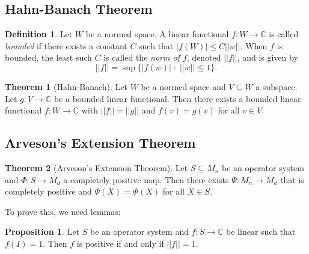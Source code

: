 \documentclass[12pt]{article}
\theoremstyle{definition}
\newtheorem*{theorem}{Theorem}
\newtheorem*{proposition}{Proposition}
\newtheorem*{definition}{Definition}
\newcommand{\C}{\mathbb{C}}
\begin{document}
\subsection{Hahn-Banach Theorem}

\begin{definition}
Let $W$ be a normed space. A linear functional $f:W \to \C$ is called \emph{bounded} if there exists a constant $C$ such that $|f(W)| \leq C||w||$. When $f$ is bounded, the least such $C$ is called the \emph{norm of $f$}, denoted $||f||$, and is given by
\[
||f|| = \sup\{|f(w)| \;:\; ||w|| \leq 1\}.
\]
\end{definition}

\begin{theorem}[Hahn-Banach]
Let $W$ be a normed space and $V \subseteq W$ a subspace. Let $g:V \to \C$ be a bounded linear functional. Then there exists a bounded linear functional $f:W \to \C$ with $||f||=||g||$ and $f(v)=g(v)$ for all $v \in V$.
\end{theorem}

\subsection{Arveson's Extension Theorem}

\begin{theorem}[Arveson's Extension Theorem]
Let $S \subseteq M_n$ be an operator system and $\Phi:S \to M_d$ a completely positive map. Then there exists $\Psi:M_n \to M_d$ that is completely positive and $\Psi(X)=\Phi(X)$ for all $X \in S$.
\end{theorem}

To prove this, we need lemmas:

\begin{proposition}
Let $S$ be an operator system and $f:S \to \C$ be linear such that $f(I)=1$. Then $f$ is positive if and only if $||f||=1$.
\end{proposition}
\end{document}
